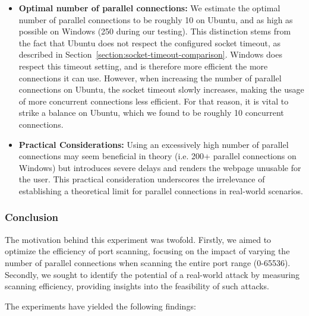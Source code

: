 \begin{itemize}

\item \textbf{Optimal number of parallel connections:} We estimate the optimal number of parallel connections to be roughly 10 on Ubuntu, and as high as possible on Windows (250 during our testing). This distinction stems from the fact that Ubuntu does not respect the configured socket timeout, as described in Section~\ref{section:socket-timeout-comparison}. Windows does respect this timeout setting, and is therefore more efficient the more connections it can use. However, when increasing the number of parallel connections on Ubuntu, the socket timeout slowly increases, making the usage of more concurrent connections less efficient. For that reason, it is vital to strike a balance on Ubuntu, which we found to be roughly 10 concurrent connections. 
\item \textbf{Practical Considerations:} Using an excessively high number of parallel connections may seem beneficial in theory (i.e. 200+ parallel connections on Windows) but introduces severe delays and renders the webpage unusable for the user. This practical consideration underscores the irrelevance of establishing a theoretical limit for parallel connections in real-world scenarios.

\end{itemize}

\subsubsection{Conclusion}

The motivation behind this experiment was twofold. Firstly, we aimed to optimize the efficiency of port scanning, focusing on the impact of varying the number of parallel connections when scanning the entire port range (0-65536). Secondly, we sought to identify the potential of a real-world attack by measuring scanning efficiency, providing insights into the feasibility of such attacks.

The experiments have yielded the following findings:

